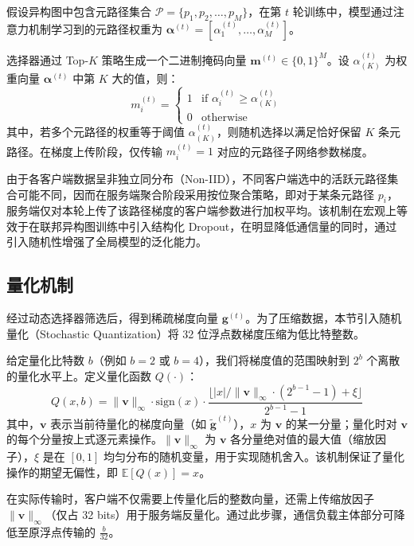 假设异构图中包含元路径集合 $\mathcal{P} = \{p_1, p_2, \dots, p_M\}$，在第 $t$ 轮训练中，模型通过注意力机制学习到的元路径权重为 $\boldsymbol{\alpha}^{(t)} = [\alpha_1^{(t)}, \dots, \alpha_M^{(t)}]$。

选择器通过 Top-$K$ 策略生成一个二进制掩码向量 $\mathbf{m}^{(t)} \in \{0, 1\}^M$。设 $\alpha_{(K)}^{(t)}$ 为权重向量 $\boldsymbol{\alpha}^{(t)}$ 中第 $K$ 大的值，则：
\begin{equation}
    m_i^{(t)} = \begin{cases}
        1 & \text{if } \alpha_i^{(t)} \ge \alpha_{(K)}^{(t)} \\
        0 & \text{otherwise}
    \end{cases}
\end{equation}
其中，若多个元路径的权重等于阈值 $\alpha_{(K)}^{(t)}$，则随机选择以满足恰好保留 $K$ 条元路径。在梯度上传阶段，仅传输 $m_i^{(t)}=1$ 对应的元路径子网络参数梯度。

由于各客户端数据呈非独立同分布（Non-IID），不同客户端选中的活跃元路径集合可能不同，因而在服务端聚合阶段采用按位聚合策略，即对于某条元路径 $p_i$，服务端仅对本轮上传了该路径梯度的客户端参数进行加权平均。该机制在宏观上等效于在联邦异构图训练中引入结构化 Dropout，在明显降低通信量的同时，通过引入随机性增强了全局模型的泛化能力。

\subsection{量化机制}
\label{subsec:quantization}
经过动态选择器筛选后，得到稀疏梯度向量 $\mathbf{g}^{(t)}$。为了压缩数据，本节引入随机量化（Stochastic Quantization）将 32 位浮点数梯度压缩为低比特整数\cite{he2025feddt}。

给定量化比特数 $b$（例如 $b=2$ 或 $b=4$），我们将梯度值的范围映射到 $2^b$ 个离散的量化水平上。定义量化函数 $Q(\cdot)$：
\begin{equation}
    Q(x, b) = \|\mathbf{v}\|_{\infty} \cdot \text{sign}(x) \cdot \frac{\lfloor |x|/\|\mathbf{v}\|_{\infty} \cdot (2^{b-1}-1) + \xi \rfloor}{2^{b-1}-1}
\end{equation}
其中，$\mathbf{v}$ 表示当前待量化的梯度向量（如 $\tilde{\mathbf{g}}^{(t)}$），$x$ 为 $\mathbf{v}$ 的某一分量；量化时对 $\mathbf{v}$ 的每个分量按上式逐元素操作。$\|\mathbf{v}\|_{\infty}$ 为 $\mathbf{v}$ 各分量绝对值的最大值（缩放因子），$\xi$ 是在 $[0, 1]$ 均匀分布的随机变量，用于实现随机舍入。该机制保证了量化操作的期望无偏性，即 $\mathbb{E}[Q(x)] = x$。

在实际传输时，客户端不仅需要上传量化后的整数向量，还需上传缩放因子 $\|\mathbf{v}\|_{\infty}$（仅占 32 bits）用于服务端反量化。通过此步骤，通信负载主体部分可降低至原浮点传输的 $\frac{b}{32}$。

